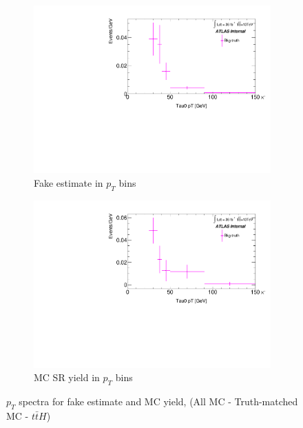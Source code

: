 \documentclass[11pt]{article}
\begin{document}
	\begin{figure}[H]
	\centering
	\begin{subfigure}{.5\textwidth}
	\centering
	\includegraphics[width=1.\linewidth]{figures/FakesEstimate_data_pp8_nonallhad_new_SubtractionFix_newOverlay/hist_FakeEstimate_Bkg-truth.pdf}
  	\caption{Fake estimate in $p_T$ bins}
  	\label{fig:sub1}
	\end{subfigure}%
	\begin{subfigure}{.5\textwidth}
	\centering
	\includegraphics[width=1.\linewidth]{figures/FakesEstimate_data_pp8_nonallhad_new_SubtractionFix_newOverlay/hist_SRMC_Bkg-truth.pdf}
	\caption{MC SR yield in $p_T$ bins}
	\end{subfigure}
	\caption{$p_T$ spectra for fake estimate and MC yield, (All MC - Truth-matched MC - $t\bar{t}H$)}
	\end{figure}
\end{document}
